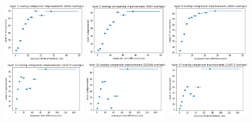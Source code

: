 \documentclass[letterpaper,11pt]{article}
\begin{document}
\begin{figure}[!ht]
\centering
\includegraphics[width=0.32\textwidth]{images/results/improvements_by_layer_polaris/layer_1_improvements_polaris}
\includegraphics[width=0.32\textwidth]{images/results/improvements_by_layer_polaris/layer_5_improvements_polaris}
\includegraphics[width=0.32\textwidth]{images/results/improvements_by_layer_polaris/layer_9_improvements_polaris}
\includegraphics[width=0.32\textwidth]{images/results/improvements_by_layer_polaris/layer_12_improvements_polaris}
\includegraphics[width=0.32\textwidth]{images/results/improvements_by_layer_polaris/layer_14_improvements_polaris}
\includegraphics[width=0.32\textwidth]{images/results/improvements_by_layer_polaris/layer_17_improvements_polaris}

\end{figure}
\end{document}

